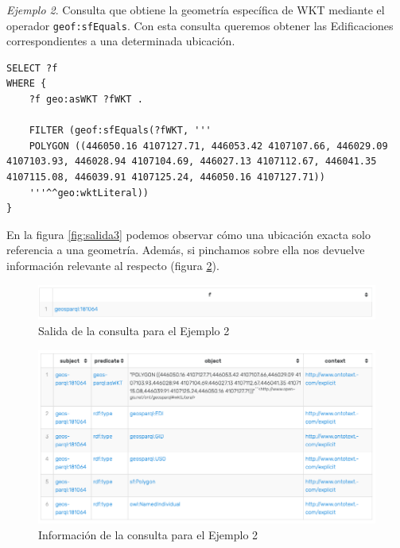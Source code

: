 \textit{Ejemplo 2}. Consulta que obtiene la geometría específica de WKT mediante el operador \texttt{geof:sfEquals}. Con esta consulta queremos obtener las Edificaciones correspondientes a una determinada ubicación.

\vspace*{0.2cm}

\begin{lstlisting}
SELECT ?f
WHERE {
	?f geo:asWKT ?fWKT .
	
	FILTER (geof:sfEquals(?fWKT, '''
	POLYGON ((446050.16 4107127.71, 446053.42 4107107.66, 446029.09 4107103.93, 446028.94 4107104.69, 446027.13 4107112.67, 446041.35 4107115.08, 446039.91 4107125.24, 446050.16 4107127.71)) 
	'''^^geo:wktLiteral))
} 
\end{lstlisting}

\vspace*{0.2cm}

En la figura \ref{fig:salida3} podemos observar cómo una ubicación exacta solo referencia a una geometría. Además, si pinchamos sobre ella nos devuelve información relevante al respecto (figura \ref{fig:info-salida}).

\begin{figure}[H]
	\centering
	\includegraphics[width=1\linewidth]{imagenes/capitulo5/salida2}
	\caption{Salida de la consulta para el Ejemplo 2}
	\label{fig:salida2}
\end{figure}

\begin{figure}[H]
	\centering
	\includegraphics[width=1\linewidth]{imagenes/capitulo5/info-salida}
	\caption{Información de la consulta para el Ejemplo 2}
	\label{fig:info-salida}
\end{figure}

